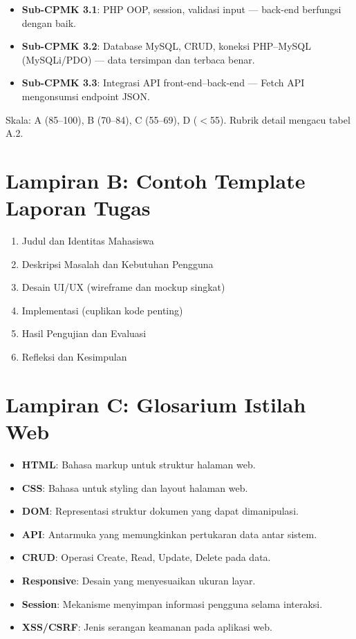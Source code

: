 \begin{itemize}
  \item \textbf{Sub-CPMK 3.1}: PHP OOP, session, validasi input --- back-end berfungsi dengan baik.
  \item \textbf{Sub-CPMK 3.2}: Database MySQL, CRUD, koneksi PHP--MySQL (MySQLi/PDO) --- data tersimpan dan terbaca benar.
  \item \textbf{Sub-CPMK 3.3}: Integrasi API front-end--back-end --- Fetch API mengonsumsi endpoint JSON.
\end{itemize}

Skala: A (85--100), B (70--84), C (55--69), D ($<$55). Rubrik detail mengacu tabel A.2.

\section*{Lampiran B: Contoh Template Laporan Tugas}
\begin{enumerate}
  \item Judul dan Identitas Mahasiswa
  \item Deskripsi Masalah dan Kebutuhan Pengguna
  \item Desain UI/UX (wireframe dan mockup singkat)
  \item Implementasi (cuplikan kode penting)
  \item Hasil Pengujian dan Evaluasi
  \item Refleksi dan Kesimpulan
\end{enumerate}

\section*{Lampiran C: Glosarium Istilah Web}
\begin{itemize}
  \item \textbf{HTML}: Bahasa markup untuk struktur halaman web.
  \item \textbf{CSS}: Bahasa untuk styling dan layout halaman web.
  \item \textbf{DOM}: Representasi struktur dokumen yang dapat dimanipulasi.
  \item \textbf{API}: Antarmuka yang memungkinkan pertukaran data antar sistem.
  \item \textbf{CRUD}: Operasi Create, Read, Update, Delete pada data.
  \item \textbf{Responsive}: Desain yang menyesuaikan ukuran layar.
  \item \textbf{Session}: Mekanisme menyimpan informasi pengguna selama interaksi.
  \item \textbf{XSS/CSRF}: Jenis serangan keamanan pada aplikasi web.
\end{itemize}

